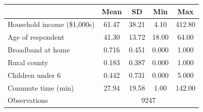 \begin{tabular}{l*{4}{c}}
\toprule
                    &\multicolumn{1}{c}{Mean}&\multicolumn{1}{c}{SD}&\multicolumn{1}{c}{Min}&\multicolumn{1}{c}{Max}\\
\midrule
Household income (\$1{,}000s)&      61.47         &      38.21         &       4.10         &     412.80         \\
Age of respondent   &      41.30         &      13.72         &      18.00         &      64.00         \\
Broadband at home   &       0.716        &       0.451        &       0.000        &       1.000        \\
Rural county        &       0.183        &       0.387        &       0.000        &       1.000        \\
Children under 6    &       0.442        &       0.731        &       0.000        &       5.000        \\
Commute time (min)  &      27.94         &      19.58         &       1.00         &     142.00         \\
\midrule
Observations        &\multicolumn{4}{c}{9247}\\
\bottomrule
\end{tabular}

